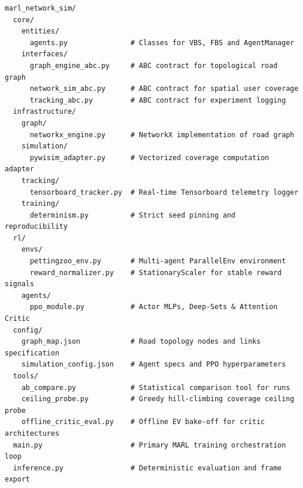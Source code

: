 \documentclass[a4paper,12pt,oneside]{report}
\begin{document}
\begin{lstlisting}[caption={ساختار پوشه‌ها و فایل‌های کلیدی پروژه}, label={lst:project_structure}]
marl_network_sim/
  core/
    entities/
      agents.py               # Classes for VBS, FBS and AgentManager
    interfaces/
      graph_engine_abc.py     # ABC contract for topological road graph
      network_sim_abc.py      # ABC contract for spatial user coverage
      tracking_abc.py         # ABC contract for experiment logging
  infrastructure/
    graph/
      networkx_engine.py      # NetworkX implementation of road graph
    simulation/
      pywisim_adapter.py      # Vectorized coverage computation adapter
    tracking/
      tensorboard_tracker.py  # Real-time Tensorboard telemetry logger
    training/
      determinism.py          # Strict seed pinning and reproducibility
  rl/
    envs/
      pettingzoo_env.py       # Multi-agent ParallelEnv environment
      reward_normalizer.py    # StationaryScaler for stable reward signals
    agents/
      ppo_module.py           # Actor MLPs, Deep-Sets & Attention Critic
  config/
    graph_map.json            # Road topology nodes and links specification
    simulation_config.json    # Agent specs and PPO hyperparameters
  tools/
    ab_compare.py             # Statistical comparison tool for runs
    ceiling_probe.py          # Greedy hill-climbing coverage ceiling probe
    offline_critic_eval.py    # Offline EV bake-off for critic architectures
  main.py                     # Primary MARL training orchestration loop
  inference.py                # Deterministic evaluation and frame export
\end{lstlisting}
\end{document}
